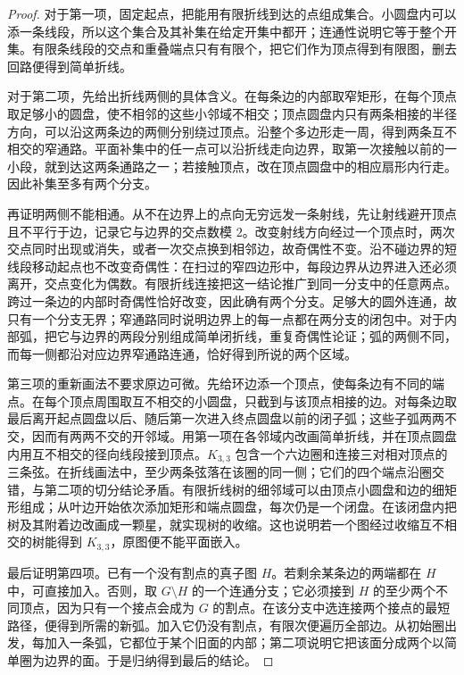 \begin{proof}
	对于第一项，固定起点，把能用有限折线到达的点组成集合。小圆盘内可以添一条线段，所以这个集合及其补集在给定开集中都开；连通性说明它等于整个开集。有限条线段的交点和重叠端点只有有限个，把它们作为顶点得到有限图，删去回路便得到简单折线。

	对于第二项，先给出折线两侧的具体含义。在每条边的内部取窄矩形，在每个顶点取足够小的圆盘，使不相邻的这些小邻域不相交；顶点圆盘内只有两条相接的半径方向，可以沿这两条边的两侧分别绕过顶点。沿整个多边形走一周，得到两条互不相交的窄通路。平面补集中的任一点可以沿折线走向边界，取第一次接触以前的一小段，就到达这两条通路之一；若接触顶点，改在顶点圆盘中的相应扇形内行走。因此补集至多有两个分支。

	再证明两侧不能相通。从不在边界上的点向无穷远发一条射线，先让射线避开顶点且不平行于边，记录它与边界的交点数模 \(2\)。改变射线方向经过一个顶点时，两次交点同时出现或消失，或者一次交点换到相邻边，故奇偶性不变。沿不碰边界的短线段移动起点也不改变奇偶性：在扫过的窄四边形中，每段边界从边界进入还必须离开，交点变化为偶数。有限折线连接把这一结论推广到同一分支中的任意两点。跨过一条边的内部时奇偶性恰好改变，因此确有两个分支。足够大的圆外连通，故只有一个分支无界；窄通路同时说明边界上的每一点都在两分支的闭包中。对于内部弧，把它与边界的两段分别组成简单闭折线，重复奇偶性论证；弧的两侧不同，而每一侧都沿对应边界窄通路连通，恰好得到所说的两个区域。

	第三项的重新画法不要求原边可微。先给环边添一个顶点，使每条边有不同的端点。在每个顶点周围取互不相交的小圆盘，只截到与该顶点相接的边。对每条边取最后离开起点圆盘以后、随后第一次进入终点圆盘以前的闭子弧；这些子弧两两不交，因而有两两不交的开邻域。用第一项在各邻域内改画简单折线，并在顶点圆盘内用互不相交的径向线段接到顶点。\(K_{3,3}\) 包含一个六边圈和连接三对相对顶点的三条弦。在折线画法中，至少两条弦落在该圈的同一侧；它们的四个端点沿圈交错，与第二项的切分结论矛盾。有限折线树的细邻域可以由顶点小圆盘和边的细矩形组成；从叶边开始依次添加矩形和端点圆盘，每次仍是一个闭盘。在该闭盘内把树及其附着边改画成一颗星，就实现树的收缩。这也说明若一个图经过收缩互不相交的树能得到 \(K_{3,3}\)，原图便不能平面嵌入。

	最后证明第四项。已有一个没有割点的真子图 \(H\)。若剩余某条边的两端都在 \(H\) 中，可直接加入。否则，取 \(G\setminus H\) 的一个连通分支；它必须接到 \(H\) 的至少两个不同顶点，因为只有一个接点会成为 \(G\) 的割点。在该分支中选连接两个接点的最短路径，便得到所需的新弧。加入它仍没有割点，有限次便遍历全部边。从初始圈出发，每加入一条弧，它都位于某个旧面的内部；第二项说明它把该面分成两个以简单圈为边界的面。于是归纳得到最后的结论。
\end{proof}

